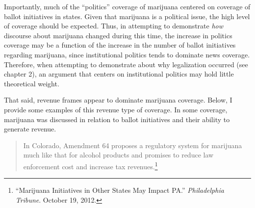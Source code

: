 Importantly, much of the ``politics'' coverage of marijuana centered on coverage of ballot initiatives in states. Given that marijuana is a political issue, the high level of coverage should be expected. Thus, in attempting to demonstrate \textit{how} discourse about marijuana changed during this time, the increase in politics coverage may be a function of the increase in the number of ballot initiatives regarding marijuana, since institutional politics tends to dominate news coverage. Therefore, when attempting to demonstrate about why legalization occurred (see chapter 2), an argument that centers on institutional politics may hold little theoretical weight. 








That said, revenue frames appear to dominate marijuana coverage. Below, I provide some examples of this revenue type of coverage. In some coverage, marijuana was discussed in relation to ballot initiatives and their ability to generate revenue. 


\begin{quotation}
\begin{singlespace}
\noindent In Colorado, Amendment 64 proposes a regulatory system for marijuana much like that for alcohol products and promises to reduce law enforcement cost and increase tax revenues.\footnote{``Marijuana Initiatives in Other States May Impact PA.'' \textit{Philadelphia Tribune}. October 19, 2012.}
\end{singlespace}
\end{quotation}

